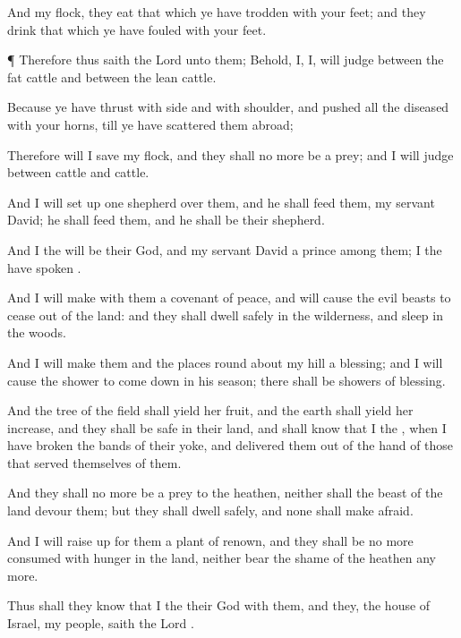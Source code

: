 {And
{} my
flock, they
eat that which ye have
trodden with your
feet; and they
drink that which ye have
fouled with your
feet.


\par }{\PP {}¶ Therefore thus
saith the
Lord
{} unto them; Behold, I,
{} I, will
judge between the
fat
cattle and between the
lean
cattle.

Because ye have
thrust with
side and with
shoulder, and
pushed all the
diseased with your
horns, till ye have
scattered them
abroad;

Therefore will I
save my
flock, and they shall no more be a
prey; and I will
judge between
cattle and
cattle.

And I will set
up
one
shepherd over them, and he shall
feed them,
{} my
servant
David; he shall
feed them, and he shall be their
shepherd.

And I the
{} will be their
God, and my
servant
David a
prince
among them; I the
{} have
spoken
{}.

And I will
make with them a
covenant of
peace, and will cause the
evil
beasts to
cease out of the
land: and they shall
dwell
safely in the
wilderness, and
sleep in the
woods.

And I will
make them and the places round
about my
hill a
blessing; and I will cause the
shower to come
down in his
season; there shall be
showers of
blessing.

And the
tree of the
field shall
yield her
fruit, and the
earth shall
yield her
increase, and they shall be
safe in their
land, and shall
know that I
{} the
{}, when I have
broken the
bands of their
yoke, and
delivered them out of the
hand of those that
served themselves of them.

And they shall no more be a
prey to the
heathen, neither shall the
beast of the
land
devour them; but they shall
dwell
safely, and none shall make
{}
afraid.

And I will raise
up for them a
plant of
renown, and they shall be no more
consumed with
hunger in the
land, neither
bear the
shame of the
heathen any more.

Thus shall they
know that I the
{} their
God
{} with them, and
{} they,
{} the
house of
Israel,
{} my
people,
saith the
Lord
{}.

}
